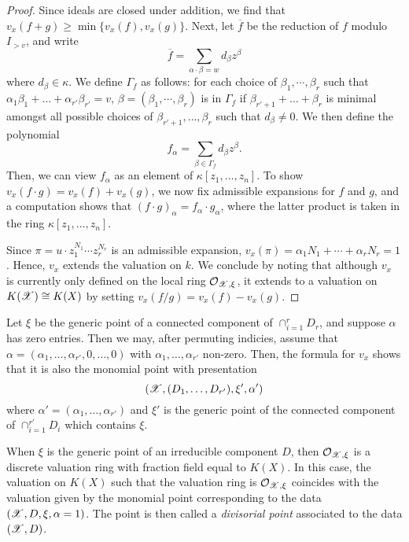\begin{proof}
Since ideals are closed under addition, we find that $v_x(f + g) \geq \min \{ v_x(f), v_x(g) \}$.
Next, let $\overline{f}$ be the reduction of $f$ modulo $I_{> v}$, and write
\[
    \overline{f} = \sum_{\alpha \cdot \beta = w} d_{\beta} z^{\beta}
\]
where $d_{\beta} \in \kappa$.
We define $\Gamma_f$ as follows: for each choice of $\beta_1, \cdots, \beta_r$ such that $\alpha_1 \beta_1 + \dots + \alpha_{r'} \beta_{r'} = v$, $\beta = (\beta_1, \cdots, \beta_r)$ is in $\Gamma_f$ if $\beta_{r' + 1} + \dots + \beta_{r}$ is minimal amongst all possible choices of $\beta_{r' +1}, \dots, \beta_{r}$ such that $d_{\beta} \neq 0$.
We then define the polynomial
\[
    f_{\alpha} = \sum_{\beta \in \Gamma_f} d_{\beta} z^{\beta}.
\]
Then, we can view $f_{\alpha}$ as an element of $\kappa[z_1, \dots, z_n]$.
To show $v_x(f \cdot g) = v_x(f) + v_x(g)$, we now fix admissible expansions for $f$ and $g$, and a computation shows that $(f \cdot g)_{\alpha} = f_{\alpha} \cdot g_{\alpha}$, where the latter product is taken in the ring $\kappa[z_1, \dots, z_n]$.

Since $\pi = u \cdot z_1^{N_1} \cdots z_r^{N_r}$ is an admissible expansion, $v_x(\pi) = \alpha_1 N_1 + \cdots + \alpha_r N_r = 1$. 
Hence, $v_x$ extends the valuation on $k$. 
We conclude by noting that although $v_x$ is currently only defined on the local ring $\mathcal{O}_{\mathscr{X}, \xi}$, it extends to a valuation on $K(\mathscr{X}) \cong K(X)$ by setting $v_x(f/g) = v_x(f) - v_x(g)$.
\end{proof}

Let $\xi$ be the generic point of a connected component of $\cap_{i = 1}^{r} D_r$, and suppose $\alpha$ has zero entries.
Then we may, after permuting indicies, assume that $\alpha = (\alpha_1, \dots, \alpha_{r'}, 0, \dots, 0)$ with $\alpha_1, \dots, \alpha_{r'}$ non-zero.
Then, the formula for $v_x$ shows that it is also the monomial point with presentation \[(\mathscr{X}, (D_1, \dots, D_{r'}), \xi', \alpha')\] where $\alpha' = (\alpha_1, \dots, \alpha_{r'})$ and $\xi'$ is the generic point of the connected component of $\cap_{i = 1}^{r'} D_i$ which contains $\xi$.

When $\xi$ is the generic point of an irreducible component $D$, then $\mathcal{O}_{\mathscr{X}, \xi}$ is a discrete valuation ring with fraction field equal to $K(X)$. 
In this case, the valuation on $K(X)$ such that the valuation ring is $\mathcal{O}_{\mathscr{X}, \xi}$ coincides with the valuation given by the monomial point corresponding to the data $(\mathscr{X}, D, \xi, \alpha = 1)$.
The point is then called a \textit{divisorial point} associated to the data $(\mathscr{X}, D)$.


